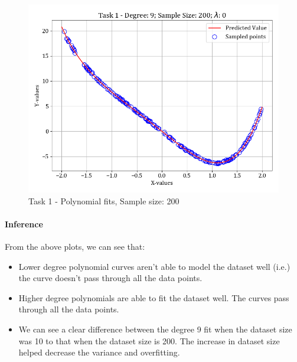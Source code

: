 \documentclass[12pt,a4paper]{article}
\begin{document}
\begin{figure}[H]
    \includegraphics[scale=0.425]{images/t1_d1/d_9_size_200_l_0.png}
    \caption{Task 1 - Polynomial fits, Sample size: 200}
\end{figure}

\paragraph{Inference}
From the above plots, we can see that:
\begin{itemize}
    \itemsep0em
    \item Lower degree polynomial curves aren't able to model the dataset well (i.e.) the curve doesn't pass through all the data points.
    \item Higher degree polynomials are able to fit the dataset well. The curves pass through all the data points.
    \item We can see a clear difference between the degree 9 fit when the dataset size was 10 to that when the dataset size is 200. The increase in dataset size helped decrease the variance and overfitting.
\end{itemize}
\end{document}
